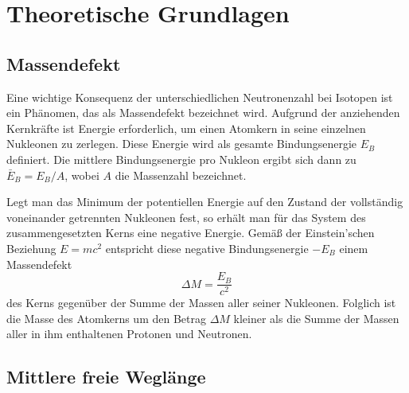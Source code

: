 \documentclass{article}
\begin{document}
\section{Theoretische Grundlagen}

\subsection{Massendefekt}

Eine wichtige Konsequenz der unterschiedlichen Neutronenzahl bei
Isotopen ist ein Phänomen, das als Massendefekt bezeichnet wird.
Aufgrund der anziehenden Kernkräfte ist Energie erforderlich, um einen
Atomkern in seine einzelnen Nukleonen zu zerlegen. Diese Energie wird
als gesamte Bindungsenergie $E_B$ definiert. Die mittlere
Bindungsenergie pro Nukleon ergibt sich dann zu $\bar{E}_B = E_B/A$,
wobei $A$ die Massenzahl bezeichnet.

Legt man das Minimum der potentiellen Energie auf den Zustand der
vollständig voneinander getrennten Nukleonen fest, so erhält man für das
System des zusammengesetzten Kerns eine negative Energie. Gemäß der
Einstein'schen Beziehung $E = mc^2$ entspricht diese negative
Bindungsenergie $-E_B$ einem Massendefekt
\begin{equation}
    \Delta M = \frac{E_B}{c^2}
    \label{eq:massendefekt}
\end{equation}
des Kerns gegenüber der Summe der Massen aller seiner Nukleonen.
Folglich ist die Masse des Atomkerns um den Betrag $\Delta M$ kleiner
als die Summe der Massen aller in ihm enthaltenen Protonen und Neutronen.

\subsection{Mittlere freie Weglänge}
\end{document}
